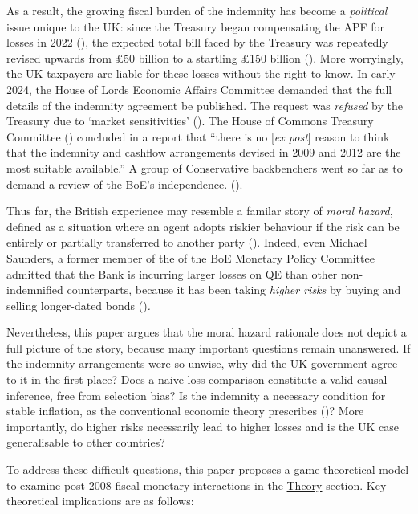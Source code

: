 \documentclass[
  a4paper,
  abstract=true]{scrartcl}
\theoremstyle{definition}
\begin{document}
As a result, the growing fiscal burden of the indemnity has become a
\emph{political} issue unique to the UK: since the Treasury began
compensating the APF for losses in 2022
(), the expected
total bill faced by the Treasury was repeatedly revised upwards from £50
billion to a startling £150 billion (). More worryingly, the UK taxpayers are liable for these
losses without the right to know. In early 2024, the House of Lords
Economic Affairs Committee demanded that the full details of the
indemnity agreement be published. The request was \emph{refused} by the
Treasury due to `market sensitivities'
(). The House of Commons
Treasury Committee () concluded
in a report that ``there is no {[}\emph{ex post}{]} reason to think that
the indemnity and cashflow arrangements devised in 2009 and 2012 are the
most suitable available.'' A group of Conservative backbenchers went so
far as to demand a review of the BoE's independence.
().

Thus far, the British experience may resemble a familar story of
\emph{moral hazard}, defined as a situation where an agent adopts
riskier behaviour if the risk can be entirely or partially transferred
to another party (). Indeed, even
Michael Saunders, a former member of the of the BoE Monetary Policy
Committee admitted that the Bank is incurring larger losses on QE than
other non-indemnified counterparts, because it has been taking
\emph{higher risks} by buying and selling longer-dated bonds
()\emph{.}

Nevertheless, this paper argues that the moral hazard rationale does not
depict a full picture of the story, because many important questions
remain unanswered. If the indemnity arrangements were so unwise, why did
the UK government agree to it in the first place? Does a naive loss
comparison constitute a valid causal inference, free from selection
bias? Is the indemnity a necessary condition for stable inflation, as
the conventional economic theory prescribes
()? More importantly, do
higher risks necessarily lead to higher losses and is the UK case
generalisable to other countries?

To address these difficult questions, this paper proposes a
game-theoretical model to examine post-2008 fiscal-monetary interactions
in the \hyperref[sec-theory]{Theory} section. Key theoretical
implications are as follows:
\end{document}
